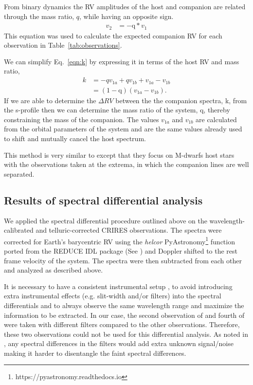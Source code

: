 From binary dynamics \citep[e.g.][]{murray_keplerian_2010} the RV amplitudes of the host and companion are related through the mass ratio, \(q \), while having an opposite sign.
\begin{align}
	v_{2}  &= -\textrm{q} * v_{1} \label{eqn:q_relation}
\end{align}
This equation was used to calculate the expected companion RV for each observation in Table~\ref{tab:observations}. 

We can simplify Eq.~\ref{eqn:k} by expressing it in terms of the host RV and mass ratio,
\begin{align}
	k &= -q v_{1a} + q v_{1b} + v_{1a} - v_{1b} \nonumber \\
	&= (1 - \textrm{q})(v_{1a} - v_{1b}). \label{eqn:k_simplified}
\end{align}
If we are able to determine the \(\Delta RV \) between the the companion spectra, k, from the s-profile \citep[see ][]{ferluga_separating_1997} then we can determine the mass ratio of the system, q, thereby constraining the mass of the companion. The values \(v_{1a} \) and \(v_{1b} \) are calculated from the orbital parameters of the system and are the same values already used to shift and mutually cancel the host spectrum.

This method is very similar to \citet{kostogryz_spectral_2013} except that they focus on M-dwarfs host stars with the observations taken at the extrema, in which the companion lines are well separated.


\subsection{Results of spectral differential analysis}

\label{appendix:A2}
We applied the spectral differential procedure outlined above on the wavelength-calibrated and telluric-corrected CRIRES observations. The spectra were corrected for Earth's barycentric RV using the \emph{helcor} PyAstronomy\footnote{https://pyastronomy.readthedocs.io} function ported from the REDUCE IDL package (See \citet[][]{piskunov_new_2002}) and Doppler shifted to the rest frame velocity of the system. The spectra were then subtracted from each other and analyzed as described above.

It is necessary to have a consistent instrumental setup \citet{ferluga_separating_1997}, to avoid introducing extra instrumental effects (e.g. slit-width and/or filters) into the spectral differentials and to always observe the same wavelength range and maximize the information to be extracted. In our case, the second observation of  and fourth of  were taken with different filters compared to the other observations. Therefore, these two observations could not be used for this differential analysis. As noted in \citep{hadrava_disentangling_2009}, any spectral differences in the filters would add extra unknown signal/noise making it harder to disentangle the faint spectral differences.


